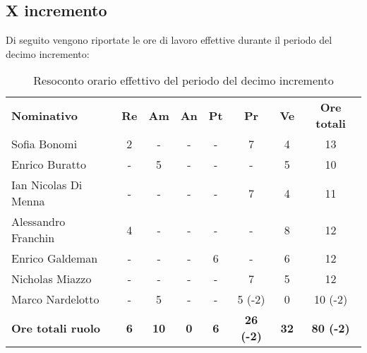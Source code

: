 \documentclass[../piano-di-progetto.tex]{subfiles}
\begin{document}
\subsection{X incremento}

Di seguito vengono riportate le ore di lavoro effettive durante il periodo del decimo incremento:
\begin{table}[H]
    \centering
    \begin{tabular}{lccccccc}
      \rowcolor{lightgray}
      \textbf{Nominativo}       & \textbf{Re}      & \textbf{Am} & \textbf{An}      & \textbf{Pt} & \textbf{Pr} & \textbf{Ve} & \textbf{Ore totali} \\
      Sofia Bonomi              & 2          & -           & -          & -          & 7                & 4           & 13               \\
Enrico Buratto            & -          & 5           & -          & -          & -                & 5           & 10               \\
Ian Nicolas Di Menna      & -          & -           & -          & -          & 7                & 4           & 11               \\
Alessandro Franchin       & 4          & -           & -          & -          & -                & 8           & 12               \\
Enrico Galdeman           & -          & -           & -          & 6          & -                & 6           & 12               \\
Nicholas Miazzo           & -          & -           & -          & -          & 7                & 5           & 12               \\
Marco Nardelotto          & -          & 5           & -          & -          & 5 (-2)           & 0           & 10 (-2)          \\
\textbf{Ore totali ruolo} & \textbf{6} & \textbf{10} & \textbf{0} & \textbf{6} & \textbf{26 (-2)} & \textbf{32} & \textbf{80 (-2)}

    \end{tabular}
    \caption{Resoconto orario effettivo del periodo del decimo incremento}
  \end{table}
\end{document}
